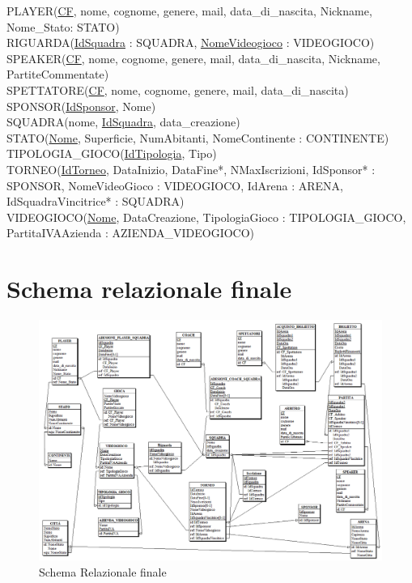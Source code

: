 \documentclass[a4paper,12pt]{report}
\begin{document}
\noindent PLAYER(\underline{CF}, nome, cognome, genere, mail, data\_di\_nascita, Nickname, Nome\_Stato: STATO) \\

\noindent RIGUARDA(\underline{IdSquadra} : SQUADRA, \underline{NomeVideogioco} : VIDEOGIOCO) \\

\noindent SPEAKER(\underline{CF}, nome, cognome, genere, mail, data\_di\_nascita, Nickname, PartiteCommentate) \\

\noindent SPETTATORE(\underline{CF}, nome, cognome, genere, mail, data\_di\_nascita) \\

\noindent SPONSOR(\underline{IdSponsor}, Nome) \\

\noindent SQUADRA(nome, \underline{IdSquadra}, data\_creazione) \\

\noindent STATO(\underline{Nome}, Superficie, NumAbitanti, NomeContinente : CONTINENTE) \\

\noindent TIPOLOGIA\_GIOCO(\underline{IdTipologia}, Tipo) \\

\noindent TORNEO(\underline{IdTorneo}, DataInizio, DataFine*, NMaxIscrizioni, IdSponsor* : SPONSOR, NomeVideoGioco : VIDEOGIOCO, IdArena : ARENA, IdSquadraVincitrice* : SQUADRA) \\

\noindent VIDEOGIOCO(\underline{Nome}, DataCreazione, TipologiaGioco : TIPOLOGIA\_GIOCO, PartitaIVAAzienda : AZIENDA\_VIDEOGIOCO) \\







\section{Schema relazionale finale}


\begin{figure}[!htb]
	\centerline{\includegraphics[scale=0.6]{img/SchemaRelazionale.png}}
	\caption{Schema Relazionale finale}
	\label{img:Schema_Relazionale}
\end{figure}
\end{document}
